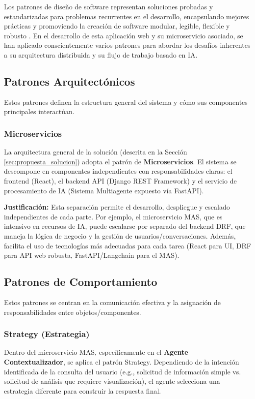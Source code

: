 Los patrones de diseño de software representan soluciones probadas y estandarizadas para problemas recurrentes en el desarrollo, encapsulando mejores prácticas y promoviendo la creación de software modular, legible, flexible y robusto \cite{gavilanez2022analisis}. En el desarrollo de esta aplicación web y su microservicio asociado, se han aplicado conscientemente varios patrones para abordar los desafíos inherentes a su arquitectura distribuida y su flujo de trabajo basado en IA.

\subsection{Patrones Arquitectónicos}
\label{subsec:patrones_arquitectonicos}

Estos patrones definen la estructura general del sistema y cómo sus componentes principales interactúan.

\subsubsection{Microservicios}
La arquitectura general de la solución (descrita en la Sección \ref{sec:propuesta_solucion}) adopta el patrón de \textbf{Microservicios}. El sistema se descompone en componentes independientes con responsabilidades claras: el frontend (React), el backend API (Django REST Framework) y el servicio de procesamiento de IA (Sistema Multiagente expuesto vía FastAPI).

\textbf{Justificación:} Esta separación permite el desarrollo, despliegue y escalado independientes de cada parte. Por ejemplo, el microservicio MAS, que es intensivo en recursos de IA, puede escalarse por separado del backend DRF, que maneja la lógica de negocio y la gestión de usuarios/conversaciones. Además, facilita el uso de tecnologías más adecuadas para cada tarea (React para UI, DRF para API web robusta, FastAPI/Langchain para el MAS).

\subsection{Patrones de Comportamiento}
\label{subsec:patrones_comportamiento}
Estos patrones se centran en la comunicación efectiva y la asignación de responsabilidades entre objetos/componentes.

\subsubsection{Strategy (Estrategia)}
Dentro del microservicio MAS, específicamente en el \textbf{Agente Contextualizador}, se aplica el patrón Strategy. Dependiendo de la intención identificada de la consulta del usuario (e.g., solicitud de información simple vs. solicitud de análisis que requiere visualización), el agente selecciona una estrategia diferente para construir la respuesta final.

